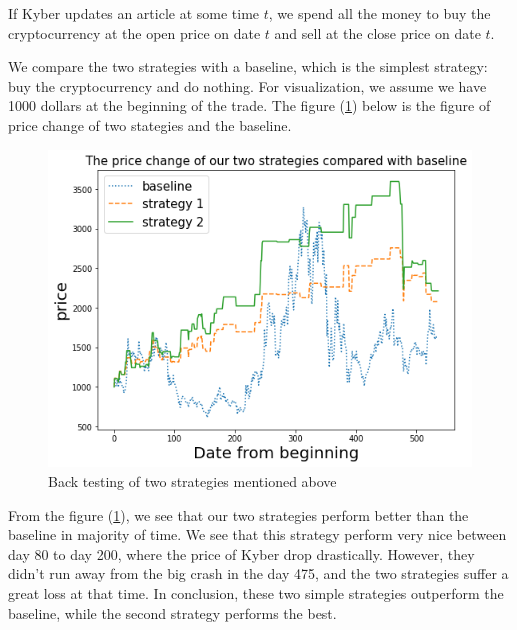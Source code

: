 \documentclass[twoside]{report}
\begin{document}
\begin{spacing}{1}
\begin{strategy}
If Kyber updates an article at some time $t$, we spend all the money to buy the cryptocurrency at the open price on date $t$ and sell at the close price on date $t$.
\end{strategy}\label{strat:Kyber2} 

We compare the two strategies with a baseline, which is the simplest strategy: buy the cryptocurrency and do nothing. For visualization, we assume we have 1000 dollars at the beginning of the trade. The figure (\ref{backtest medium}) below is the figure of price change of two stategies and the baseline.


\begin{figure}[!htbp]
    \centering
    \includegraphics[scale =  0.8]{Images/medium backtesting.png}
    \caption{Back testing of two strategies mentioned above }
    \label{backtest medium}
\end{figure}

From the figure (\ref{backtest medium}), we see that our two strategies perform better than the baseline in majority of time. We see that this strategy perform very nice between day 80 to day 200, where the price of Kyber drop drastically. However, they didn't run away from the big crash in the day 475, and the two strategies suffer a great loss at that time. In conclusion, these two simple strategies outperform the baseline, while the second strategy performs the best.







\end{spacing}
\end{document}
